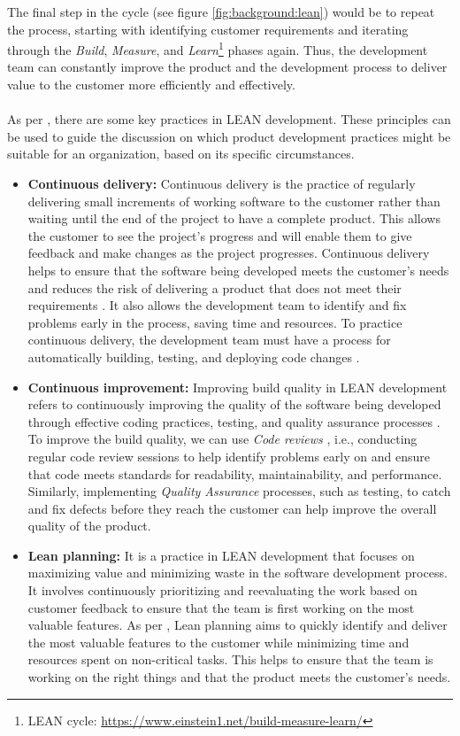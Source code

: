 The final step in the cycle (see figure \ref{fig:background:lean}) would be to repeat the process, starting with identifying customer requirements and iterating through the \textit{Build}, \textit{Measure}, and \textit{Learn}\footnote{LEAN cycle: \url{https://www.einstein1.net/build-measure-learn/}} phases again.
Thus, the development team can constantly improve the product and the development process to deliver value to the customer more efficiently and effectively. \\\\
As per \cite{misc:lean:tutorial}, there are some key practices in LEAN development.
These principles can be used to guide the discussion on which product development practices might be suitable for an organization, based on its specific circumstances.
\begin{itemize}
  \item[] \textbf{Continuous delivery:} Continuous delivery is the practice of regularly delivering small increments of working software to the customer rather than waiting until the end of the project to have a complete product. This allows the customer to see the project's progress and will enable them to give feedback and make changes as the project progresses. Continuous delivery helps to ensure that the software being developed meets the customer's needs and reduces the risk of delivering a product that does not meet their requirements \cite{article:lean:eric}. It also allows the development team to identify and fix problems early in the process, saving time and resources. To practice continuous delivery, the development team must have a process for automatically building, testing, and deploying code changes \cite{misc:lean:cicd}.
  \item[] \textbf{Continuous improvement:} Improving build quality in LEAN development refers to continuously improving the quality of the software being developed through effective coding practices, testing, and quality assurance processes \cite{misc:lean:cimp}. To improve the build quality, we can use \textit{Code reviews} \cite{misc:lean:tutorial}, i.e., conducting regular code review sessions to help identify problems early on and ensure that code meets standards for readability, maintainability, and performance. Similarly, implementing \textit{Quality Assurance} processes, such as testing, to catch and fix defects before they reach the customer can help improve the overall quality of the product.
  \item[] \textbf{Lean planning:} It is a practice in LEAN development that focuses on maximizing value and minimizing waste in the software development process. It involves continuously prioritizing and reevaluating the work based on customer feedback to ensure that the team is first working on the most valuable features. As per \cite{misc:lean:planning}, Lean planning aims to quickly identify and deliver the most valuable features to the customer while minimizing time and resources spent on non-critical tasks. This helps to ensure that the team is working on the right things and that the product meets the customer's needs. 
\end{itemize}
